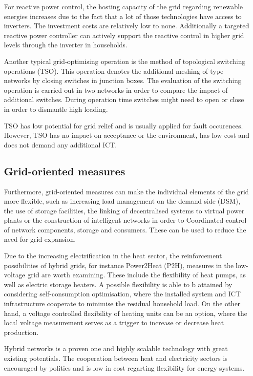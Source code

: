 For reactive power control, the hosting capacity of the grid regarding renewable energies increases due to the fact that a lot of those technologies have access to inverters. The investment costs are relatively low to none. Additionally a targeted reactive power controller can actively support the reactive control in higher grid levels through the inverter in households.~\cite{monamaßnahmen}

Another typical grid-optimising operation is the method of topological switching operations (TSO). This operation denotes the additional meshing of type networks by closing switches in junction boxes. The evaluation of the switching operation is carried out in two networks in order to compare the impact of additional switches. During operation time switches might need to open or close in order to dismantle high loading.~\cite{mona}

TSO has low potential for grid relief and is usually applied for fault occurences. However, TSO has no impact on acceptance or the environment, has low cost and does not demand any additional ICT.~\cite{monamaßnahmen}

\subsection{Grid-oriented measures}

Furthermore, grid-oriented measures can make the individual elements of the grid more flexible, such as increasing load management on the demand side (DSM), the use of storage facilities, the linking of decentralised systems to virtual power plants or the construction of intelligent networks in order to Coordinated control of network components, storage and consumers. These can be used to reduce the need for grid expansion.

Due to the increasing electrification in the heat sector, the reinforcement possibilities of hybrid grids, for instance Power2Heat (P2H), measures in the low-voltage grid are worth examining. These include the flexibility of heat pumps, as well as electric storage heaters. A possible flexibility is able to b attained by considering self-consumption optimisation, where the installed system and ICT infrastructure cooperate to minimise the residual household load. On the other hand, a voltage controlled flexibility of heating units can be an option, where the local voltage measurement serves as a trigger to increase or decrease heat production.~\cite{mona}

Hybrid networks is a proven one and highly scalable technology with great existing potentials. The cooperation between heat and electricity sectors is encouraged by politics and is low in cost regarting flexibility for energy systems.~\cite{monamaßnahmen}

